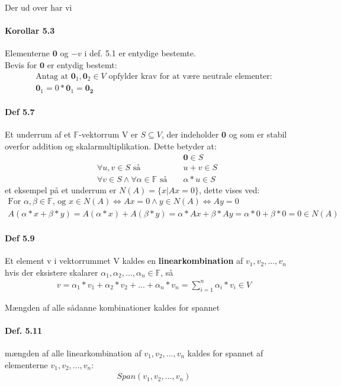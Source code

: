 \documentclass[paper=a4, fontsize=11pt]{scrartcl} %
\begin{document}
	Der ud over har vi
	\paragraph{Korollar 5.3} Elementerne $\mathbf{0}$ og $-v$ i def. 5.1 er entydige bestemte. \\
	Bevis for $\mathbf{0}$ er entydig bestemt:
	\begin{gather*}
	\text{Antag at $\mathbf{0}_1, \mathbf{0}_2\in V$ opfylder krav for at være neutrale elementer:} \\
	\mathbf{0}_1=0*\mathbf{0}_1=\mathbf{0_2}
	\end{gather*}
	
	\paragraph{Def 5.7} Et underrum af et $\mathbb{F}$-vektorrum V er  $S \subseteq V$, der indeholder $\mathbf{0}$ og som er stabil overfor addition og skalarmultiplikation. Dette betyder at:
	\setcounter{equation}{0}
	\begin{align}
	& &&\mathbf{0}\in S  \\
	&\forall u,v \in S \text{ så } &&u+v\in S \\
	&\forall v \in S \land \forall\alpha\in\mathbb{F} \text{ så } &&\alpha*u\in S
	\end{align}
	et eksempel på et underrum er $N(A)=\{x|Ax=0\}$, dette vises ved:
	\begin{gather*}
	\text{For } \alpha, \beta\in\mathbb{F} \text{, og }x\in N(A) \iff Ax=0 \land y\in N(A) \iff Ay=0 \\
	A(\alpha*x+\beta*y)=A(\alpha*x)+A(\beta*y)=\alpha*Ax+\beta*Ay=\alpha*0+\beta*0=0\in N(A)	
	\end{gather*}
	
	\paragraph{Def 5.9} Et element v i vektorrummet V kaldes en \textbf{linearkombination} af $v_1,v_2,...,v_n$ hvis der eksistere skalarer $\alpha_1,\alpha_2,...,\alpha_n\in\mathbb{F}$, så
	\begin{align*}
	v=\alpha_1*v_1+\alpha_2*v_2+...+\alpha_n*v_n=\sum_{i=1}^{n}\alpha_i*v_i \in V
	\end{align*}
	
	Mængden af alle sådanne kombinationer kaldes for spannet
	
	\paragraph{Def. 5.11} mængden af alle linearkombination af $v_1,v_2,...,v_n$ kaldes for spannet af elementerne $v_1,v_2,...,v_n$:
	\begin{align*}
	Span(v_1,v_2,...,v_n)
	\end{align*}
	
\end{document}

